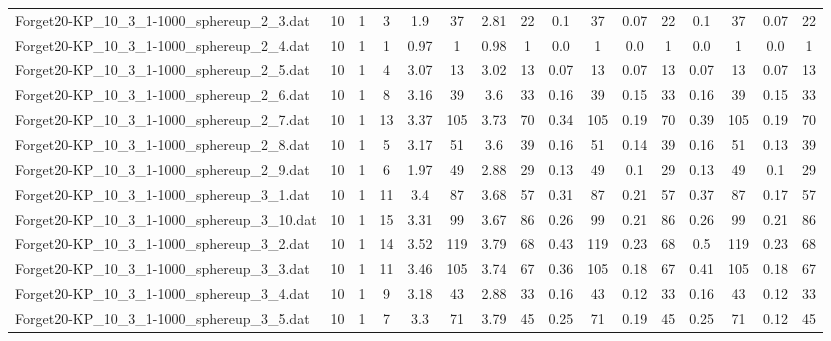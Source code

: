 \begin{sidewaystable}[!ht]
{\begin{tabular}{lccccccccccccccc}
Forget20-KP\_10\_3\_1-1000\_sphereup\_2\_3.dat & 10 & 1 & 3 & 1.9 & 37 & 2.81 & 22 & 0.1 & 37 &  \textcolor{blue2}{0.07} & 22 & 0.1 & 37 &  \textcolor{blue2}{0.07} & 22 \\
Forget20-KP\_10\_3\_1-1000\_sphereup\_2\_4.dat & 10 & 1 & 1 & 0.97 & 1 & 0.98 & 1 &  \textcolor{blue2}{0.0} & 1 &  \textcolor{blue2}{0.0} & 1 &  \textcolor{blue2}{0.0} & 1 &  \textcolor{blue2}{0.0} & 1 \\
Forget20-KP\_10\_3\_1-1000\_sphereup\_2\_5.dat & 10 & 1 & 4 & 3.07 & 13 & 3.02 & 13 &  \textcolor{blue2}{0.07} & 13 &  \textcolor{blue2}{0.07} & 13 &  \textcolor{blue2}{0.07} & 13 &  \textcolor{blue2}{0.07} & 13 \\
Forget20-KP\_10\_3\_1-1000\_sphereup\_2\_6.dat & 10 & 1 & 8 & 3.16 & 39 & 3.6 & 33 & 0.16 & 39 & 0.15 & 33 & 0.16 & 39 & 0.15 & 33 \\
Forget20-KP\_10\_3\_1-1000\_sphereup\_2\_7.dat & 10 & 1 & 13 & 3.37 & 105 & 3.73 & 70 & 0.34 & 105 &  \textcolor{blue2}{0.19} & 70 & 0.39 & 105 &  \textcolor{blue2}{0.19} & 70 \\
Forget20-KP\_10\_3\_1-1000\_sphereup\_2\_8.dat & 10 & 1 & 5 & 3.17 & 51 & 3.6 & 39 & 0.16 & 51 & 0.14 & 39 & 0.16 & 51 &  \textcolor{blue2}{0.13} & 39 \\
Forget20-KP\_10\_3\_1-1000\_sphereup\_2\_9.dat & 10 & 1 & 6 & 1.97 & 49 & 2.88 & 29 & 0.13 & 49 &  \textcolor{blue2}{0.1} & 29 & 0.13 & 49 &  \textcolor{blue2}{0.1} & 29 \\
Forget20-KP\_10\_3\_1-1000\_sphereup\_3\_1.dat & 10 & 1 & 11 & 3.4 & 87 & 3.68 & 57 & 0.31 & 87 & 0.21 & 57 & 0.37 & 87 &  \textcolor{blue2}{0.17} & 57 \\
Forget20-KP\_10\_3\_1-1000\_sphereup\_3\_10.dat & 10 & 1 & 15 & 3.31 & 99 & 3.67 & 86 & 0.26 & 99 &  \textcolor{blue2}{0.21} & 86 & 0.26 & 99 &  \textcolor{blue2}{0.21} & 86 \\
Forget20-KP\_10\_3\_1-1000\_sphereup\_3\_2.dat & 10 & 1 & 14 & 3.52 & 119 & 3.79 & 68 & 0.43 & 119 &  \textcolor{blue2}{0.23} & 68 & 0.5 & 119 &  \textcolor{blue2}{0.23} & 68 \\
Forget20-KP\_10\_3\_1-1000\_sphereup\_3\_3.dat & 10 & 1 & 11 & 3.46 & 105 & 3.74 & 67 & 0.36 & 105 &  \textcolor{blue2}{0.18} & 67 & 0.41 & 105 &  \textcolor{blue2}{0.18} & 67 \\
Forget20-KP\_10\_3\_1-1000\_sphereup\_3\_4.dat & 10 & 1 & 9 & 3.18 & 43 & 2.88 & 33 & 0.16 & 43 &  \textcolor{blue2}{0.12} & 33 & 0.16 & 43 &  \textcolor{blue2}{0.12} & 33 \\
Forget20-KP\_10\_3\_1-1000\_sphereup\_3\_5.dat & 10 & 1 & 7 & 3.3 & 71 & 3.79 & 45 & 0.25 & 71 & 0.19 & 45 & 0.25 & 71 &  \textcolor{blue2}{0.12} & 45 \\

\end{tabular}}
\end{sidewaystable}
